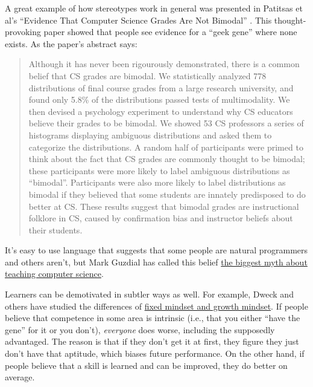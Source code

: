 A great example of how stereotypes work in general was presented in
Patitsas et al's ``Evidence That Computer Science Grades Are Not
Bimodal'' \cite{bib:patitsas-cs-grades}.  This thought-provoking paper
showed that people see evidence for a ``geek gene'' where none exists.
As the paper's abstract says:

\begin{quote}

  Although it has never been rigourously demonstrated, there is a
  common belief that CS grades are bimodal. We statistically analyzed
  778 distributions of final course grades from a large research
  university, and found only 5.8\% of the distributions passed tests
  of multimodality. We then devised a psychology experiment to
  understand why CS educators believe their grades to be bimodal. We
  showed 53 CS professors a series of histograms displaying ambiguous
  distributions and asked them to categorize the distributions. A
  random half of participants were primed to think about the fact that
  CS grades are commonly thought to be bimodal; these participants
  were more likely to label ambiguous distributions as ``bimodal''.
  Participants were also more likely to label distributions as bimodal
  if they believed that some students are innately predisposed to do
  better at CS. These results suggest that bimodal grades are
  instructional folklore in CS, caused by confirmation bias and
  instructor beliefs about their students.

\end{quote}

It's easy to use language that suggests that some people are natural
programmers and others aren't, but Mark Guzdial has called this belief
\href{http://cacm.acm.org/blogs/blog-cacm/189498-top-10-myths-about-teaching-computer-science/fulltext}{the
biggest myth about teaching computer science}.  


Learners can be demotivated in subtler ways as well. For example,
Dweck and others have studied the differences of
\href{https://en.wikipedia.org/wiki/Mindset\#Fixed\_mindset\_and\_growth\_mindset}{fixed
mindset and growth mindset}. If people believe that competence in some
area is intrinsic (i.e., that you either ``have the gene'' for it or you
don't), \emph{everyone} does worse, including the supposedly advantaged.
The reason is that if they don't get it at first, they figure they just
don't have that aptitude, which biases future performance. On the other
hand, if people believe that a skill is learned and can be improved,
they do better on average.

